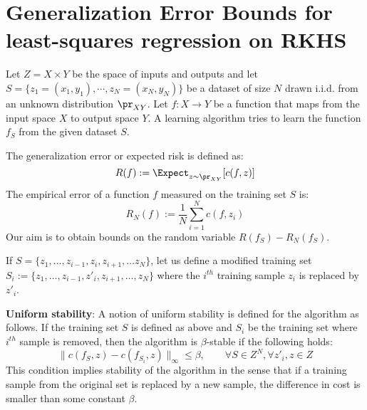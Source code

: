 \chapter{Generalization Error Bounds for least-squares regression on RKHS }%
\label{a:bousquet}
Let $Z = X \times Y$ be the space of inputs and outputs and let $S = \{z_1 = (x_1, y_1), \cdots,z_N = (x_N,y_N)\}$ be a dataset of size $N$ drawn i.i.d. from an unknown distribution $\pr_{XY}$. Let $f:X \to Y$ be a function that maps from the input space $X$ to output space $Y$. A learning algorithm tries to learn the function $f_S$ from the given dataset $S$. 

The generalization error or expected risk is defined as:
\[
R(f) := \Expect_{z \sim \pr_{XY}} [c(f,z)]
\]
The empirical error of a function $f$ measured on the training set $S$ is:
\[
R_N(f) := \frac{1}{N}\sum_{i=1}^N c(f,z_i)
\]
Our aim is to obtain bounds on the random variable $R(f_S) - R_N(f_S)$. 

If $S = \{z_1,\dots, z_{i-1},z_i,z_{i+1},\dots z_N\}$, let us define a modified training set $S_i :=\{z_1,\dots, z_{i-1},z'_i,z_{i+1},\dots,z_N\}$ where the $i^{th}$ training sample $z_i$ is replaced by $z'_i$.

\textbf{Uniform stability}: A notion of uniform stability is defined for the algorithm as follows. If the training set $S$ is defined as above and $S_i$ be the training set where $i^{th}$ sample is removed, then the algorithm is $\beta$-stable if the following holds:
\[
\|c(f_S, z ) - c(f_{S_i},z)\|_{\infty} \leq \beta, \qquad \forall S \in Z^N, \forall z'_i, z \in Z
\]
This condition implies stability of the algorithm in the sense that if a training sample from the original set is replaced by a new sample, the difference in cost is smaller than some constant $\beta$. 

